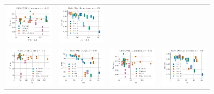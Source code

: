 \begin{figure}
\begin{tabular}{c c c c}
		\includegraphics[width=0.23\linewidth]{figures/glove400k_sentiment_trec_test-acc_vs_gram-large-dim-delta1-2-trans_linx.pdf} &
		\includegraphics[width=0.23\linewidth]{figures/glove-wiki400k-am_sentiment_trec_test-acc_vs_gram-large-dim-delta1-2-trans_linx.pdf} \\
		\includegraphics[width=0.23\linewidth]{figures/glove400k_qa_best-f1_vs_gram-large-dim-delta2-2_linx.pdf} &
		\includegraphics[width=0.23\linewidth]{figures/glove-wiki400k-am_qa_best-f1_vs_gram-large-dim-delta2-2_linx.pdf} &
		\includegraphics[width=0.23\linewidth]{figures/glove400k_sentiment_trec_test-acc_vs_gram-large-dim-delta2-2_linx.pdf} &
		\includegraphics[width=0.23\linewidth]{figures/glove-wiki400k-am_sentiment_trec_test-acc_vs_gram-large-dim-delta2-2_linx.pdf} \\

\end{tabular}
\end{figure}
